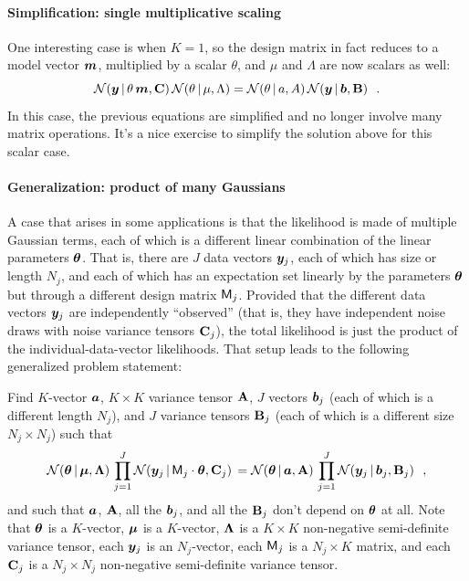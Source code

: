 \paragraph{Simplification: single multiplicative scaling}

One interesting case is when $K=1$, so the design matrix in fact
reduces to a model vector $\boldsymbol{m}$, multiplied by a scalar $\theta$, and
$\mu$ and $\Lambda$ are now scalars as well:
\begin{equation}
\mathcal{N}\!\,(\boldsymbol{y}\,|\,\theta\,\boldsymbol{m},\mathbf{C})\,\mathcal{N}\!\,(\theta\,|\,\mu,\Lambda) = \mathcal{N}\!\,(\theta\,|\, a,A)\,\mathcal{N}\!\,(\boldsymbol{y}\,|\,\boldsymbol{b},\mathbf{B})
~~.
\end{equation}
In this case, the previous equations are simplified and no longer
involve many matrix operations. It's a nice exercise to simplify the
solution above for this scalar case.


\paragraph{Generalization: product of many Gaussians}

A case that arises in some applications is that the
likelihood is made of multiple Gaussian terms, each of which is a
different linear combination of the linear parameters $\boldsymbol{\theta}$.
That is, there are $J$ data vectors $\boldsymbol{y}_j$, each of which has size or length $N_j$,
and each of which has an expectation
set linearly by the parameters $\boldsymbol{\theta}$ but through a different design matrix $\mathsf{M}_j$.
Provided that the different data vectors $\boldsymbol{y}_j$ are independently ``observed'' (that
is, they have independent noise draws with noise variance tensors $\mathbf{C}_j$),
the total likelihood is just the product of
the individual-data-vector likelihoods.
That setup leads to the following generalized problem statement:

Find $K$-vector $\boldsymbol{a}$, $K\times K$ variance tensor $\mathbf{A}$, $J$ vectors $\boldsymbol{b}_j$ (each
of which is a different length $N_j$),
and $J$ variance tensors $\mathbf{B}_j$ (each of which is a different size $N_j\times N_j$)
such that
\begin{equation}\label{eq:genproblem}
\mathcal{N}\!\,(\boldsymbol{\theta}\,|\,\boldsymbol{\mu},\mathbf{\Lambda})\,\prod_{j=1}^J\mathcal{N}\!\,(\boldsymbol{y}_j\,|\,\mathsf{M}_j\cdot\boldsymbol{\theta},\mathbf{C}_j)\,
 = \mathcal{N}\!\,(\boldsymbol{\theta}\,|\,\boldsymbol{a},\mathbf{A})\,\prod_{j=1}^J\mathcal{N}\!\,(\boldsymbol{y}_j\,|\,\boldsymbol{b}_j,\mathbf{B}_j) ~~,
\end{equation}
and such that $\boldsymbol{a}$, $\mathbf{A}$, all the $\boldsymbol{b}_j$, and all the $\mathbf{B}_j$
don't depend on $\boldsymbol{\theta}$ at all.
Note that
$\boldsymbol{\theta}$ is a $K$-vector,
$\boldsymbol{\mu}$ is a $K$-vector,
$\mathbf{\Lambda}$ is a $K\times K$ non-negative semi-definite variance tensor,
each $\boldsymbol{y}_j$ is an $N_j$-vector,
each $\mathsf{M}_j$ is a $N_j\times K$ matrix,
and
each $\mathbf{C}_j$ is a $N_j\times N_j$ non-negative semi-definite variance tensor.

